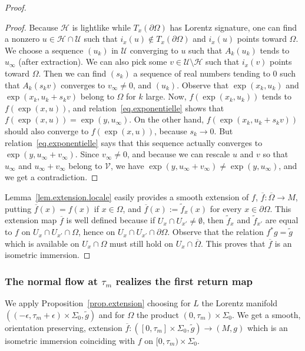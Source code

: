 \begin{proof}
\begin{proof}
Because ${\mathcal H}$ is lightlike while $T_x(\partial \Omega)$ has Lorentz signature, one can find a nonzero $u \in {\mathcal H} \cap {\mathcal U}$ such that $i_{x}(u) \not \in T_x(\partial \Omega)$ and $i_{x}(u)$ points toward $\Omega$. We choose a sequence $(u_k)$ in $\mathcal{U}$ converging to $u$ such that $A_k(u_k)$ tends to $u_{\infty}$ (after extraction). We can also pick some $v \in {\mathcal{U}}\setminus { \mathcal{H}}$ such that $i_x(v)$ points toward $\Omega$. Then we can find $(s_k)$ a sequence of real numbers tending to $0$ such that $A_k(s_k v)$ converges to $v_{\infty} \not =0$, and $(u_k)$. Observe that $\exp(x_k,u_k)$ and $\exp(x_k, u_k + s_kv)$ belong to $\Omega$ for $k$ large. Now, $f(\exp(x_k,u_k))$ tends to $f(\exp(x,u))$, and relation~\eqref{eq.exponentielle} shows that $f(\exp(x,u))=\exp(y,u_{\infty})$. On the other hand, $f(\exp(x_k, u_k+s_k v))$ should also converge to $f(\exp(x,u))$, because $s_k \to 0$. But relation~\eqref{eq.exponentielle} says that this sequence actually converges to $\exp(y,u_{\infty}+v_{\infty})$. Since $v_{\infty} \not =0$, and because we can rescale $u$ and $v$ so that $u_{\infty}$ and $u_{\infty}+v_{\infty}$ belong to ${\mathcal V}$, we have $\exp(y,u_{\infty}+v_{\infty}) \not = \exp(y,u_{\infty})$, and we get a contradiction.
\end{proof}



Lemma~\ref{lem.extension.locale} easily provides a smooth extension of $f$, $\overline{f}: \overline{\Omega} \to M $, putting $\overline{f}(x)=f(x)$ if $x \in \Omega$, and $\overline{f}(x):=\tilde{f}_x(x)$ for every $x \in \partial \Omega$. This extension map $\overline{f}$ is well defined because if $U_x \cap U_{x'} \not = \emptyset$, then $\tilde{f}_x$ and $\tilde{f}_{x'}$ are equal to $f$ on $U_x \cap U_{x'}\cap \Omega$, hence on $U_x \cap U_{x'}\cap \partial \Omega$. Observe that the relation $f^*g=\tilde{g}$ which is available on $U_x \cap \Omega$ must still hold on $U_x \cap \overline{\Omega}$. This proves that $\overline{f}$ is an isometric immersion.
\end{proof}


\subsubsection{The normal flow at \texorpdfstring{$\tau_m$}{taum} realizes the first return map} We apply Proposition~\ref{prop.extension} choosing for $L$ the Lorentz manifold $((- \epsilon, \tau_m + \epsilon) \times \Sigma_0, \tilde{g})$ and for ${\Omega}$ the product $(0,\tau_m) \times \Sigma_0$. We get a smooth, orientation preserving, extension $\overline{f} : ([0,\tau_m] \times \Sigma_0, \tilde{g}) \to (M,g)$ which is an isometric immersion coinciding with $f$ on $[0,\tau_m) \times \Sigma_0$.

